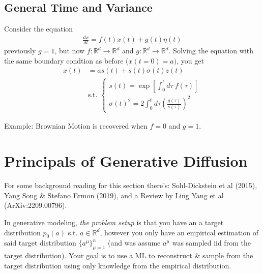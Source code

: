 \subsection{General Time and Variance}
Consider the equation
\begin{align}
	\frac{dx}{dt} = f(t) x(t) + g(t) \eta(t)
\end{align}
previously $g = 1$, but now $f: \mathbb R^d \to \mathbb R^d$ and $g: \mathbb R^d \to \mathbb R^d$. Solving the equation with the same boundary condtion as before ($x(t=0) = a)$, you get
\begin{align}
	x(t) & = a s(t) + s(t) \sigma(t) z(t)\\
	& \text{s.t. }\begin{cases}
		s(t) = \exp\left[ \int_0^t d\tau ~f(\tau) \right]\\
		\sigma(t)^2 = 2 \int_0^t d\tau \left (\frac{g(\tau)}{s(\tau)} \right)^2
	\end{cases}
\end{align}
\begin{sidework}
	Example: Brownian Motion is recovered when $f=0$ and $g = 1$.
\end{sidework}

\section{Principals of Generative Diffusion}
\begin{sidework}
	For some background reading for this section there's: Sohl-Dickstein et al (2015), Yang Song \& Stefano Ermon (2019), and a Review by Ling Yang et al (ArXiv:2209.00796). 
\end{sidework}
In generative modeling, \emph{the problem setup} is that you have an a target distribution $p_0(a)$ s.t. $a\in \mathbb R^d$, however you only have an empirical estimation of said target distribution $\{a^\mu\}_{\mu=1}^n$ (and was assume $a^\mu$ was sampled iid from the target distribution). Your goal is to use a ML to reconstruct \& sample from the target distribution using only knowledge from the empirical distribution.

